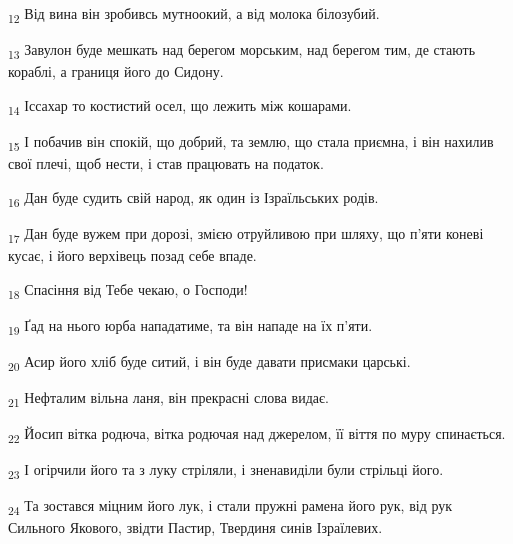 \begin{tcolorbox}
\textsubscript{12} Від вина він зробивсь мутноокий, а від молока білозубий.
\end{tcolorbox}
\begin{tcolorbox}
\textsubscript{13} Завулон буде мешкать над берегом морським, над берегом тим, де стають кораблі, а границя його до Сидону.
\end{tcolorbox}
\begin{tcolorbox}
\textsubscript{14} Іссахар то костистий осел, що лежить між кошарами.
\end{tcolorbox}
\begin{tcolorbox}
\textsubscript{15} І побачив він спокій, що добрий, та землю, що стала приємна, і він нахилив свої плечі, щоб нести, і став працювать на податок.
\end{tcolorbox}
\begin{tcolorbox}
\textsubscript{16} Дан буде судить свій народ, як один із Ізраїльських родів.
\end{tcolorbox}
\begin{tcolorbox}
\textsubscript{17} Дан буде вужем при дорозі, змією отруйливою при шляху, що п'яти коневі кусає, і його верхівець позад себе впаде.
\end{tcolorbox}
\begin{tcolorbox}
\textsubscript{18} Спасіння від Тебе чекаю, о Господи!
\end{tcolorbox}
\begin{tcolorbox}
\textsubscript{19} Ґад на нього юрба нападатиме, та він нападе на їх п'яти.
\end{tcolorbox}
\begin{tcolorbox}
\textsubscript{20} Асир його хліб буде ситий, і він буде давати присмаки царські.
\end{tcolorbox}
\begin{tcolorbox}
\textsubscript{21} Нефталим вільна ланя, він прекрасні слова видає.
\end{tcolorbox}
\begin{tcolorbox}
\textsubscript{22} Йосип вітка родюча, вітка родючая над джерелом, її віття по муру спинається.
\end{tcolorbox}
\begin{tcolorbox}
\textsubscript{23} І огірчили його та з луку стріляли, і зненавиділи були стрільці його.
\end{tcolorbox}
\begin{tcolorbox}
\textsubscript{24} Та зостався міцним його лук, і стали пружні рамена його рук, від рук Сильного Якового, звідти Пастир, Твердиня синів Ізраїлевих.
\end{tcolorbox}
